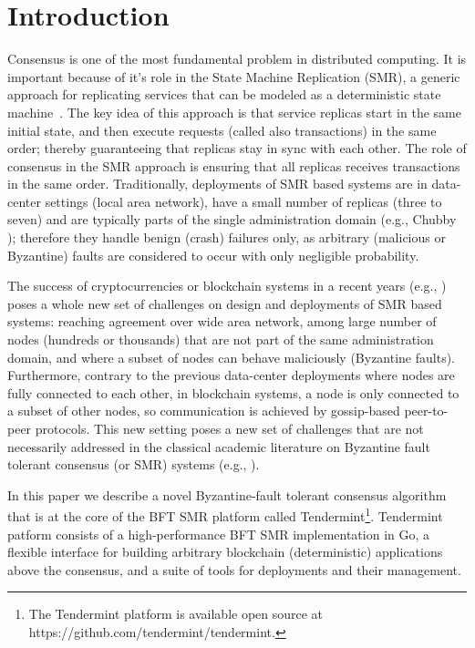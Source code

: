 \section{Introduction}
\label{sec:tendermint}

Consensus is one of the most fundamental problem in distributed computing. It is important because of it's role in the State Machine Replication (SMR), a generic approach for replicating services that can be modeled as a deterministic state machine~\cite{Lam78:cacm, Sch90:survey}. The key idea of this approach is that service replicas start in the same initial state, and then execute requests (called also transactions) in the same order; thereby guaranteeing that replicas stay in sync with each other. The role of consensus in the SMR approach is ensuring that all replicas receives transactions in the same order. 
Traditionally, deployments of SMR based systems are in data-center settings (local area network), have a small number of replicas (three to seven) and are typically parts of the single administration domain (e.g., Chubby \cite{Bur:osdi06}); therefore they handle benign (crash) failures only, as arbitrary (malicious or Byzantine) faults are considered to occur with only negligible probability.  

The success of cryptocurrencies or blockchain systems in a recent years (e.g., \cite{Nak2012:bitcoin, But2014:ethereum}) poses a whole new set of challenges on design and deployments of SMR based systems: reaching agreement over wide area network, among large number of nodes (hundreds or thousands) that are not part of the same administration domain, and where a subset of nodes can behave maliciously (Byzantine faults). Furthermore, contrary to the previous data-center deployments where nodes are fully connected to each other, in blockchain systems, a node is only connected to a subset of other nodes, so communication is achieved by gossip-based peer-to-peer protocols. This new setting poses a new set of challenges that are not necessarily addressed in the classical academic literature on Byzantine fault tolerant consensus (or SMR) systems (e.g., \cite{DLS88:jacm, CL02:tcs}).

In this paper we describe a novel Byzantine-fault tolerant consensus algorithm that is at the core of the BFT SMR platform called Tendermint\footnote{The Tendermint platform is available open source at https://github.com/tendermint/tendermint.}. Tendermint patform consists
of a high-performance BFT SMR implementation in Go, a flexible interface for building arbitrary blockchain (deterministic) applications above the consensus, and a suite of tools for deployments and their management.  

